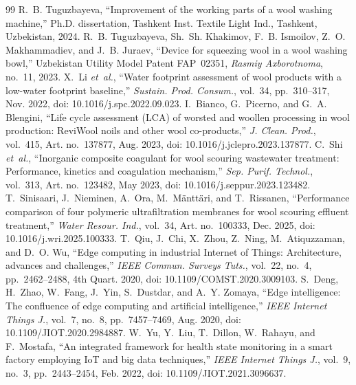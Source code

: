 \documentclass[journal]{IEEEtran}
\begin{document}

\begin{thebibliography}{99}
 R.~B. Tuguzbayeva, ``Improvement of the working parts of a wool washing machine,'' Ph.D.
dissertation, Tashkent Inst. Textile Light Ind., Tashkent, Uzbekistan, 2024.
 R.~B. Tuguzbayeva, Sh.~Sh. Khakimov, F.~B. Ismoilov, Z.~O. Makhammadiev, and J.~B. Juraev,
``Device for squeezing wool in a wool washing bowl,'' Uzbekistan Utility Model Patent FAP~02351,
\emph{Rasmiy Axborotnoma}, no.~11, 2023.
 X.~Li \emph{et~al.}, ``Water footprint assessment of wool products with a low-water footprint baseline,'' \emph{Sustain. Prod. Consum.}, vol.~34, pp.~310--317, Nov. 2022, doi: 10.1016/j.spc.2022.09.023.
 I.~Bianco, G.~Picerno, and G.~A. Blengini, ``Life cycle assessment (LCA) of worsted and woollen processing in wool production: ReviWool\textregistered{} noils and other wool co-products,'' \emph{J. Clean. Prod.}, vol.~415, Art. no.~137877, Aug. 2023, doi: 10.1016/j.jclepro.2023.137877.
 C.~Shi \emph{et~al.}, ``Inorganic composite coagulant for wool scouring wastewater treatment: Performance, kinetics and coagulation mechanism,'' \emph{Sep. Purif. Technol.}, vol.~313, Art. no.~123482, May 2023, doi: 10.1016/j.seppur.2023.123482.
 T.~Sinisaari, J.~Nieminen, A.~Ora, M.~M\"{a}ntt\"{a}ri, and T.~Rissanen, ``Performance comparison of four polymeric ultrafiltration membranes for wool scouring effluent treatment,'' \emph{Water Resour. Ind.}, vol.~34, Art. no.~100333, Dec. 2025, doi: 10.1016/j.wri.2025.100333.
 T.~Qiu, J.~Chi, X.~Zhou, Z.~Ning, M.~Atiquzzaman, and D.~O. Wu, ``Edge computing in industrial Internet of Things: Architecture, advances and challenges,'' \emph{IEEE Commun. Surveys Tuts.}, vol.~22, no.~4, pp.~2462--2488, 4th Quart. 2020, doi: 10.1109/COMST.2020.3009103.
 S.~Deng, H.~Zhao, W.~Fang, J.~Yin, S.~Dustdar, and A.~Y. Zomaya, ``Edge intelligence: The confluence of edge computing and artificial intelligence,'' \emph{IEEE Internet Things J.}, vol.~7, no.~8, pp.~7457--7469, Aug. 2020, doi: 10.1109/JIOT.2020.2984887.
 W.~Yu, Y.~Liu, T.~Dillon, W.~Rahayu, and F.~Mostafa, ``An integrated framework for health state monitoring in a smart factory employing IoT and big data techniques,'' \emph{IEEE Internet Things J.}, vol.~9, no.~3, pp.~2443--2454, Feb. 2022, doi: 10.1109/JIOT.2021.3096637.

\end{thebibliography}
\end{document}
